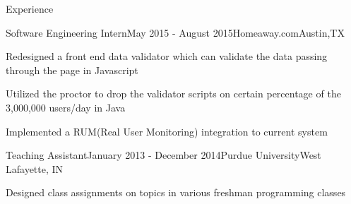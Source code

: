\documentclass{resume} %
\begin{document}
\begin{rSection}{Experience}

\begin{rSubsection}{Software Engineering Intern}{May 2015 - August 2015}{Homeaway.com}{Austin,TX}
\item Redesigned a front end data validator which can validate the data passing through the page in Javascript
\item Utilized the proctor to drop the validator scripts on certain percentage of the 3,000,000 users/day in Java
\item Implemented a RUM(Real User Monitoring) integration to current system  
\end{rSubsection}

\begin{rSubsection}{Teaching Assistant}{January 2013 - December 2014}{Purdue University}{West Lafayette, IN}
\item Designed class assignments on topics in various freshman programming classes
\end{rSubsection}


\end{rSection}


\end{document}

